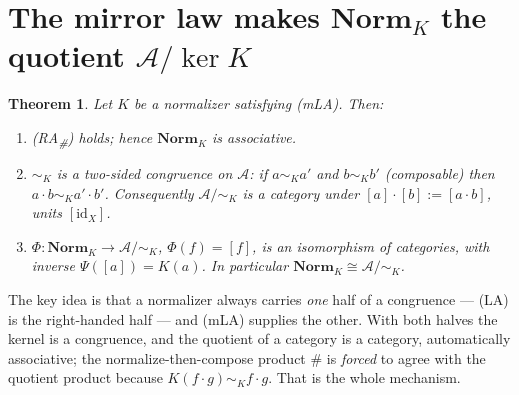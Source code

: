 \documentclass[11pt]{amsart}
\theoremstyle{plain}
\newtheorem{theorem}{Theorem}[section]
\theoremstyle{definition}
\theoremstyle{remark}
\newcommand{\Norm}{\mathbf{Norm}}
\newcommand{\id}{\mathrm{id}}
\newcommand{\sh}{\mathbin{\#}}
\newcommand{\LA}{\textsf{(LA)}}
\newcommand{\mLA}{\textsf{(mLA)}}
\newcommand{\RA}{\textsf{(RA}\textsubscript{\#}\textsf{)}}
\newcommand{\simK}{\mathrel{\sim_{K}}}
\begin{document}
\section{The mirror law makes \texorpdfstring{$\Norm_K$}{Norm K} the quotient \texorpdfstring{$\mathcal{A}/\!\ker K$}{A/ker K}}
\label{sec:thm1}

\begin{theorem}
\label{thm:quotient}
Let $K$ be a normalizer satisfying \mLA{}. Then:
\begin{enumerate}
  \item \RA{} holds; hence $\Norm_K$ is associative.
  \item $\simK$ is a \emph{two-sided congruence} on $\mathcal{A}$: if $a\simK a'$ and $b\simK b'$
        (composable) then $a\cdot b\simK a'\cdot b'$. Consequently $\mathcal{A}/\!\simK$ is a category
        under $[a]\cdot[b]:=[a\cdot b]$, units $[\id_X]$.
  \item $\Phi\colon\Norm_K\to\mathcal{A}/\!\simK$, $\Phi(f)=[f]$, is an \emph{isomorphism of
        categories}, with inverse $\Psi([a])=K(a)$. In particular $\Norm_K\cong\mathcal{A}/\!\simK$.
\end{enumerate}
\end{theorem}

The key idea is that a normalizer always carries \emph{one} half of a congruence --- \LA{} is the
right-handed half --- and \mLA{} supplies the other. With both halves the kernel is a congruence, and
the quotient of a category is a category, automatically associative; the normalize-then-compose
product $\sh$ is \emph{forced} to agree with the quotient product because $K(f\cdot g)\simK f\cdot g$.
That is the whole mechanism.
\end{document}
